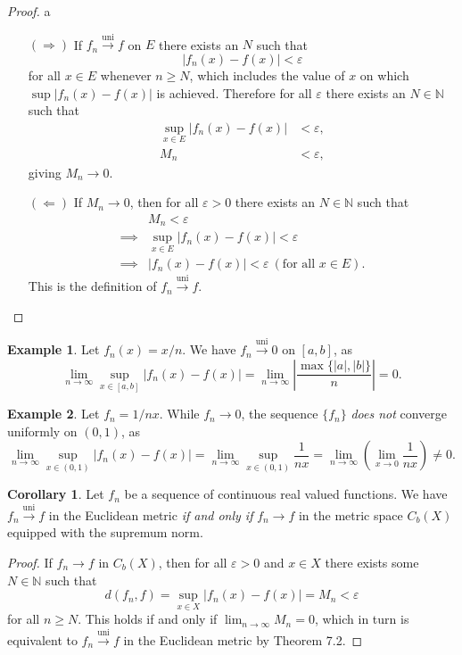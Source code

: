 \documentclass{article}
\newcommand{\N}{\mathbb{N}}
\newcommand{\M}{\mathcal{M}}
\newcommand{\uni}{\overset{\text{uni}}{\to}}
\theoremstyle{definition}
\newtheorem{corollary}{Corollary}[section]
\newtheorem{example}{Example}[section]
\begin{document}
	\begin{proof}{\color{white}a}
		\begin{enumerate}
			\item [$ (\Longrightarrow) $] If $ f_n\uni f $ on $E$ there exists an $ N $ such that $$ |f_n(x)-f(x)|<\varepsilon$$ for all $ x\in E $ whenever $ n\ge N $, which includes the value of $ x $ on which $\sup |f_n(x)-f(x)| $ is achieved. Therefore for all $ \varepsilon $ there exists an $ N\in\N $ such that
			\begin{align*}
				\sup_{x\in E}|f_n(x)-f(x)|&<\varepsilon,\\M_n&<\varepsilon,
			\end{align*}
			giving $ M_n\to 0 $. 
			\item [$ (\Longleftarrow) $]  If $ M_n\to 0 $, then for all $ \varepsilon>0 $ there exists an $ N\in\N $ such that \begin{align*}
				&M_n<\varepsilon\\\implies&\sup_{x\in E}|f_n(x)-f(x)|<\varepsilon\\\implies& |f_n(x)-f(x)|<\varepsilon\ (\text{for all }x\in E).
			\end{align*} 
			This is the definition of $ f_n\uni f $. 
		\end{enumerate}
	\end{proof}
	\begin{example}
		Let $ f_n(x)=x/n $. We have $ f_n\uni 0 $ on $ [a,b] $, as $$ \lim\limits_{n\to\infty}\sup_{x\in [a,b]}|f_n(x)-f(x)|=\lim\limits_{n\to\infty}\left\lvert\frac{\max\{|a|,|b|\}}{n}\right\rvert=0.$$
	\end{example}
	\begin{example}
		Let $ f_n=1/nx $. While $ f_n\to 0 $, the sequence $ \{f_n\} $ \textit{does not} converge uniformly on $ (0,1) $, as $$ \lim\limits_{n\to\infty}\sup_{x\in (0,1)}|f_n(x)-f(x)|=\lim\limits_{n\to\infty}\sup_{x\in (0,1)}\frac{1}{nx}= \lim\limits_{n\to\infty}\left(\lim\limits_{x\to0}\frac{1}{nx}\right)\neq 0.$$
	\end{example}
	\begin{corollary}
		Let $ f_n $ be a sequence of continuous real valued functions. We have $ f_n\uni f $ in the Euclidean metric \textit{if and only if} $ f_n\to f $ in the metric space $ C_b(X) $ equipped with the supremum norm.
	\end{corollary}
	\begin{proof}
		If $ f_n\to f $ in $ C_b(X) $, then for all $ \varepsilon>0 $ and $ x\in X $ there exists some $ N\in\N $ such that $$ d(f_n,f)=\sup_{x\in X}|f_n(x)-f(x)|=M_n<\varepsilon$$ for all $ n\ge N $. This holds if and only if $ \lim_{n\to\infty}M_n=0 $, which in turn is equivalent to $ f_n\uni f $ in the Euclidean metric by Theorem 7.2.
	\end{proof}
\end{document}
